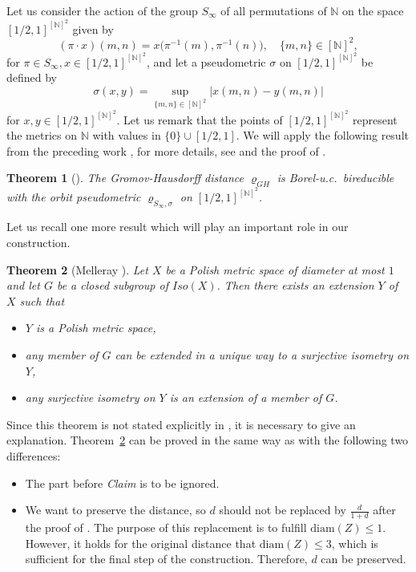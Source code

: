 \documentclass[a4paper]{amsart}
\theoremstyle{plain}
\newtheorem{theorem}{Theorem}[section]
\theoremstyle{remark}
\begin{document}
Let us consider the action of the group $ S_{\infty} $ of all permutations of $ \mathbb{N} $ on the space $ [1/2, 1]^{[\mathbb{N}]^{2}} $ given by
$$ (\pi \cdot x)(m, n) = x \big( \pi^{-1}(m), \pi^{-1}(n) \big), \quad \{ m, n \} \in [\mathbb{N}]^{2}, $$
for $ \pi \in S_{\infty}, x \in [1/2, 1]^{[\mathbb{N}]^{2}} $, and let a pseudometric $ \sigma $ on $ [1/2, 1]^{[\mathbb{N}]^{2}} $ be defined by
$$ \sigma(x, y) = \sup_{\{ m, n \} \in [\mathbb{N}]^{2}} \big| x(m, n) - y(m, n) \big| $$
for $ x, y \in [1/2, 1]^{[\mathbb{N}]^{2}} $. Let us remark that the points of $ [1/2, 1]^{[\mathbb{N}]^{2}} $ represent the metrics on $ \mathbb{N} $ with values in $ \{ 0 \} \cup [1/2, 1] $. We will apply the following result from the preceding work \cite{cdk1}, for more details, see \cite[Theorem~11]{cdk1} and the proof of \cite[Theorem~26]{cdk1}.


\begin{theorem}[\cite{cdk1}] \label{thmcdk}
The Gromov-Hausdorff distance $ \varrho_{GH} $ is Borel-u.c.~bireducible with the orbit pseudometric $ \varrho_{S_{\infty}, \sigma} $ on $ [1/2, 1]^{[\mathbb{N}]^{2}} $.
\end{theorem}


Let us recall one more result which will play an important role in our construction.


\begin{theorem}[Melleray \cite{melleray}] \label{thmmelleray}
Let $ X $ be a Polish metric space of diameter at most $ 1 $ and let $ G $ be a closed subgroup of $ Iso(X) $. Then there exists an extension $ Y $ of $ X $ such that
\begin{itemize}
\item $ Y $ is a Polish metric space,
\item any member of $ G $ can be extended in a unique way to a surjective isometry on $ Y $,
\item any surjective isometry on $ Y $ is an extension of a member of $ G $.
\end{itemize}
\end{theorem}

Since this theorem is not stated explicitly in \cite{melleray}, it is necessary to give an explanation. Theorem~\ref{thmmelleray} can be proved in the same way as \cite[Theorem~1.1]{melleray} with the following two differences:
\begin{itemize}
\item The part before \emph{Claim} is to be ignored.
\item We want to preserve the distance, so $ d $ should not be replaced by $ \frac{d}{1+d} $ after the proof of \cite[Lemma~3.2]{melleray}. The purpose of this replacement is to fulfill $ \mathrm{diam}(Z) \leq 1 $. However, it holds for the original distance that $ \mathrm{diam}(Z) \leq 3 $, which is sufficient for the final step of the construction. Therefore, $ d $ can be preserved.
\end{itemize}
\end{document}
